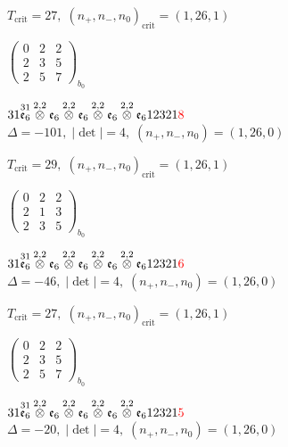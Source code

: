 \documentclass[10pt]{article}
\begin{document}
\hspace{1em}$T_{\text{crit}}=27,\; (n_+,n_-,n_0)_{\text{crit}}=(1,26,1)$

\hspace{2em}$\left(\begin{smallmatrix}0 & 2 & 2 \\ 2 & 3 & 5 \\ 2 & 5 & 7\end{smallmatrix}\right)_{\!b_0}$

\smallskip

$31\overset{31}{\mathfrak{e}_6}\overset{2,2}{\otimes}\mathfrak{e}_6\overset{2,2}{\otimes}\mathfrak{e}_6\overset{2,2}{\otimes}\mathfrak{e}_6\overset{2,2}{\otimes}\mathfrak{e}_612321\textcolor{red}{8}$ \quad $\Delta=-101,\; |\det|=4,\; (n_+,n_-,n_0)=(1,26,0)$

\hspace{1em}$T_{\text{crit}}=29,\; (n_+,n_-,n_0)_{\text{crit}}=(1,26,1)$

\hspace{2em}$\left(\begin{smallmatrix}0 & 2 & 2 \\ 2 & 1 & 3 \\ 2 & 3 & 5\end{smallmatrix}\right)_{\!b_0}$

$31\overset{31}{\mathfrak{e}_6}\overset{2,2}{\otimes}\mathfrak{e}_6\overset{2,2}{\otimes}\mathfrak{e}_6\overset{2,2}{\otimes}\mathfrak{e}_6\overset{2,2}{\otimes}\mathfrak{e}_612321\textcolor{red}{6}$ \quad $\Delta=-46,\; |\det|=4,\; (n_+,n_-,n_0)=(1,26,0)$

\hspace{1em}$T_{\text{crit}}=27,\; (n_+,n_-,n_0)_{\text{crit}}=(1,26,1)$

\hspace{2em}$\left(\begin{smallmatrix}0 & 2 & 2 \\ 2 & 3 & 5 \\ 2 & 5 & 7\end{smallmatrix}\right)_{\!b_0}$

$31\overset{31}{\mathfrak{e}_6}\overset{2,2}{\otimes}\mathfrak{e}_6\overset{2,2}{\otimes}\mathfrak{e}_6\overset{2,2}{\otimes}\mathfrak{e}_6\overset{2,2}{\otimes}\mathfrak{e}_612321\textcolor{red}{5}$ \quad $\Delta=-20,\; |\det|=4,\; (n_+,n_-,n_0)=(1,26,0)$
\end{document}
